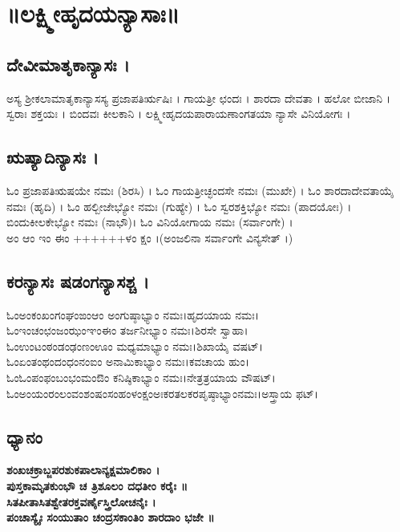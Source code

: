 \thispagestyle{empty}
\chapter*{\center ॥ಲಕ್ಷ್ಮೀಹೃದಯನ್ಯಾಸಾಃ॥}
\section{ದೇವೀಮಾತೃಕಾನ್ಯಾಸಃ ।}
ಅಸ್ಯ ಶ್ರೀಕಲಾಮಾತೃಕಾನ್ಯಾಸಸ್ಯ ಪ್ರಜಾಪತಿರ್ಋಷಿಃ । ಗಾಯತ್ರೀ ಛಂದಃ । ಶಾರದಾ ದೇವತಾ । ಹಲೋ ಬೀಜಾನಿ । ಸ್ವರಾಃ ಶಕ್ತಯಃ । ಬಿಂದವಃ ಕೀಲಕಾನಿ । ಲಕ್ಷ್ಮೀಹೃದಯಪಾರಾಯಣಾಂಗತಯಾ ನ್ಯಾಸೇ ವಿನಿಯೋಗಃ ।
\section{ಋಷ್ಯಾದಿನ್ಯಾಸಃ ।}
ಓಂ ಪ್ರಜಾಪತಿಋಷಯೇ ನಮಃ (ಶಿರಸಿ) । ಓಂ ಗಾಯತ್ರೀಚ್ಛಂದಸೇ ನಮಃ (ಮುಖೇ) । ಓಂ ಶಾರದಾದೇವತಾಯೈ ನಮಃ (ಹೃದಿ) । ಓಂ ಹಲ್ಬೀಜೇಭ್ಯೋ ನಮಃ (ಗುಹ್ಯೇ) । ಓಂ ಸ್ವರಶಕ್ತಿಭ್ಯೋ ನಮಃ (ಪಾದಯೋಃ) ।ಬಿಂದುಕೀಲಕೇಭ್ಯೋ ನಮಃ (ನಾಭೌ)। ಓಂ ವಿನಿಯೋಗಾಯ ನಮಃ (ಸರ್ವಾಂಗೇ) ।\\
ಅಂ ಆಂ ಇಂ ಈಂ ++++++ಳಂ ಕ್ಷಂ ।(ಅಂಜಲಿನಾ ಸರ್ವಾಂಗೇ ವಿನ್ಯಸೇತ್ ।)
\section{ಕರನ್ಯಾಸಃ ಷಡಂಗನ್ಯಾಸಶ್ಚ ।}
ಓಂಅಂಕಂಖಂಗಂಘಂಙಂಆಂ ಅಂಗುಷ್ಠಾಭ್ಯಾಂ ನಮಃ।ಹೃದಯಾಯ ನಮಃ।\\
ಓಂಇಂಚಂಛಂಜಂಝಂಞಂಈಂ ತರ್ಜನೀಭ್ಯಾಂ ನಮಃ।ಶಿರಸೇ ಸ್ವಾಹಾ।\\
ಓಂಉಂಟಂಠಂಡಂಢಂಣಂಊಂ ಮಧ್ಯಮಾಭ್ಯಾಂ ನಮಃ।ಶಿಖಾಯೈ ವಷಟ್।\\
ಓಂಏಂತಂಥಂದಂಧಂನಂಐಂ ಅನಾಮಿಕಾಭ್ಯಾಂ ನಮಃ।ಕವಚಾಯ ಹುಂ।\\
ಓಂಓಂಪಂಫಂಬಂಭಂಮಂಔಂ ಕನಿಷ್ಠಿಕಾಭ್ಯಾಂ ನಮಃ।ನೇತ್ರತ್ರಯಾಯ ವೌಷಟ್।\\
ಓಂಅಂಯಂರಂಲಂವಂಶಂಷಂಸಂಹಂಳಂಕ್ಷಂಅಃಕರತಲಕರಪೃಷ್ಠಾಭ್ಯಾಂನಮಃ।ಅಸ್ತ್ರಾಯ ಫಟ್।
\section{ಧ್ಯಾನಂ}
{\bfseries ಶಂಖಚಕ್ರಾಬ್ಜಪರಶುಕಪಾಲಾನ್ಯಕ್ಷಮಾಲಿಕಾಂ ।\\
ಪುಸ್ತಕಾಮೃತಕುಂಭೌ ಚ ತ್ರಿಶೂಲಂ ದಧತೀಂ ಕರೈಃ ॥\\
ಸಿತಪೀತಾಸಿತಶ್ವೇತರಕ್ತವರ್ಣೈಸ್ತ್ರಿಲೋಚನೈಃ ।\\
ಪಂಚಾಸ್ಯೈಃ ಸಂಯುತಾಂ ಚಂದ್ರಸಕಾಂತಿಂ ಶಾರದಾಂ ಭಜೇ ॥}
